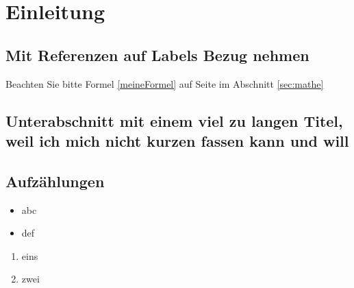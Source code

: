 \section{Einleitung}

\subsection{Mit Referenzen auf Labels Bezug nehmen}

Beachten Sie bitte Formel \eqref{meineFormel} auf Seite \pageref{meineFormel} im Abschnitt \ref{sec:mathe}


\subsection[Kurztitel für das Inhaltsverzeichnis]{Unterabschnitt mit einem viel zu langen Titel, weil ich mich nicht kurzen fassen kann und will}





\subsection{Aufzählungen}

\begin{itemize}
\item abc
\item def
\end{itemize}

\begin{enumerate}
\item eins
\item zwei
\end{enumerate}
